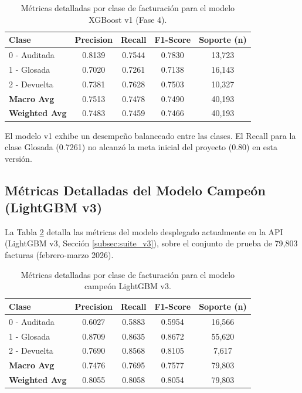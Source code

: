 \documentclass[12pt,letterpaper]{report}
\begin{document}
\begin{table}[H]
\centering
\caption{Métricas detalladas por clase de facturación para el modelo XGBoost v1 (Fase 4).}
\label{tab:metricas_clase}
\begin{tabular}{@{}lcccc@{}}
\toprule
\textbf{Clase} & \textbf{Precision} & \textbf{Recall} & \textbf{F1-Score} & \textbf{Soporte (n)} \\
\midrule
0 - Auditada & 0.8139 & 0.7544 & 0.7830 & 13,723 \\
1 - Glosada & 0.7020 & 0.7261 & 0.7138 & 16,143 \\
2 - Devuelta & 0.7381 & 0.7628 & 0.7503 & 10,327 \\
\midrule
\textbf{Macro Avg} & 0.7513 & 0.7478 & 0.7490 & 40,193 \\
\textbf{Weighted Avg} & 0.7483 & 0.7459 & 0.7466 & 40,193 \\
\bottomrule
\end{tabular}
\end{table}

El modelo v1 exhibe un desempeño balanceado entre las clases. El Recall para la clase Glosada (0.7261) no alcanzó la meta inicial del proyecto (0.80) en esta versión.

\subsection{Métricas Detalladas del Modelo Campeón (LightGBM v3)}
La Tabla \ref{tab:metricas_clase_v3} detalla las métricas del modelo desplegado actualmente en la API (LightGBM v3, Sección \ref{subsec:suite_v3}), sobre el conjunto de prueba de 79,803 facturas (febrero-marzo 2026).

\begin{table}[H]
\centering
\caption{Métricas detalladas por clase de facturación para el modelo campeón LightGBM v3.}
\label{tab:metricas_clase_v3}
\begin{tabular}{@{}lcccc@{}}
\toprule
\textbf{Clase} & \textbf{Precision} & \textbf{Recall} & \textbf{F1-Score} & \textbf{Soporte (n)} \\
\midrule
0 - Auditada & 0.6027 & 0.5883 & 0.5954 & 16,566 \\
1 - Glosada & 0.8709 & 0.8635 & 0.8672 & 55,620 \\
2 - Devuelta & 0.7690 & 0.8568 & 0.8105 & 7,617 \\
\midrule
\textbf{Macro Avg} & 0.7476 & 0.7695 & 0.7577 & 79,803 \\
\textbf{Weighted Avg} & 0.8055 & 0.8058 & 0.8054 & 79,803 \\
\bottomrule
\end{tabular}
\end{table}
\end{document}

